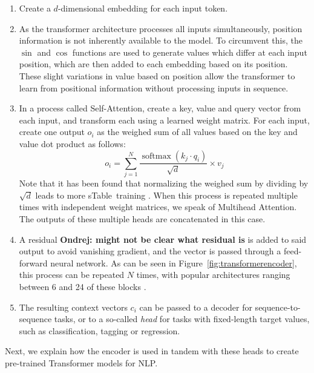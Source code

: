 \documentclass[bsc,deptreport,ai]{infthesis} %
\newcommand{\Ondrej}[1]{{\color{red} \textbf{Ondrej: #1}}}
\DeclareMathOperator{\softmax}{softmax}
\begin{document}
\begin{enumerate}
    \item Create a $d$-dimensional embedding for each input token. 
    \item As the transformer architecture processes all inputs simultaneously, position information is not inherently available to the model. To circumvent this, the $\sin$ and $\cos$ functions are used to generate values which differ at each input position, which are then added to each embedding based on its position. These slight variations in value based on position allow the transformer to learn from positional information without processing inputs in sequence.
    \item In a process called Self-Attention, create a key, value and query vector from each input, and transform each using a learned weight matrix. For each input, create one output $o_i$ as the weighed sum of all values based on the key and value dot product as follows: $$o_i=\sum_{j=1}^N \frac{\softmax(k_j\cdot q_i)}{\sqrt{d}}\times v_j$$ Note that it has been found that normalizing the weighed sum by dividing by $\sqrt{d}$ leads to more sTable~training \citep{vaswani2017}. When this process is repeated multiple times with independent weight matrices, we speak of Multihead Attention. The outputs of these multiple heads are concatenated in this case.
    \item A residual\Ondrej{might not be clear what residual is} is added to said output to avoid vanishing gradient, and the vector is passed through a feed-forward neural network. As can be seen in Figure~\ref{fig:transformerencoder}, this process can be repeated $N$ times, with popular architectures ranging between 6 and 24 of these blocks \citep{transformersurvey}.
    \item The resulting context vectors $c_i$ can be passed to a decoder for sequence-to-sequence tasks, or to a so-called \emph{head} for tasks with fixed-length target values, such as classification, tagging or regression.
\end{enumerate}
Next, we explain how the encoder is used in tandem with these heads to create pre-trained Transformer models for NLP.
\end{document}
